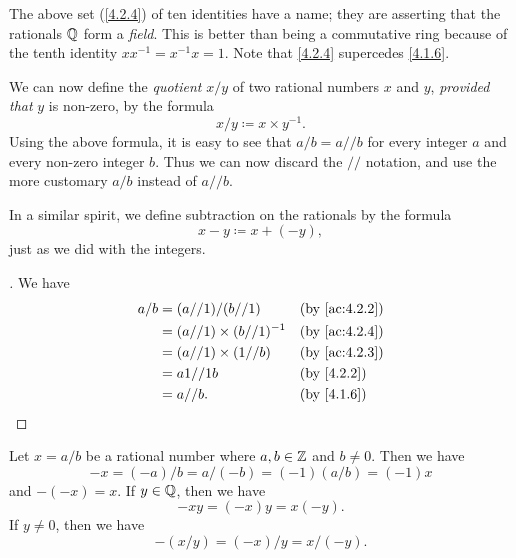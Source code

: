 \begin{rmk}\label{4.2.5}
  The above set (\cref{4.2.4}) of ten identities have a name;
  they are asserting that the rationals \(\mathbb{Q}\) form a \emph{field}.
  This is better than being a commutative ring because of the tenth identity \(xx^{-1} = x^{-1}x = 1\).
  Note that \cref{4.2.4} supercedes \cref{4.1.6}.
\end{rmk}

\begin{ac}\label{ac:4.2.4}
  We can now define the \emph{quotient} \(x / y\) of two rational numbers \(x\) and \(y\), \emph{provided that} \(y\) is non-zero, by the formula
  \[
    x / y \coloneqq x \times y^{-1}.
  \]
  Using the above formula, it is easy to see that \(a / b = a // b\) for every integer \(a\) and every non-zero integer \(b\).
  Thus we can now discard the \(//\) notation, and use the more customary \(a / b\) instead of \(a // b\).

  In a similar spirit, we define subtraction on the rationals by the formula
  \[
    x - y \coloneqq x + (-y),
  \]
  just as we did with the integers.
\end{ac}

\begin{proof}[]
  We have
  \begin{align*}
    a / b & = (a // 1) / (b // 1)           &  & \by{ac:4.2.2} \\
          & = (a // 1) \times (b // 1)^{-1} &  & \by{ac:4.2.4} \\
          & = (a // 1) \times (1 // b)      &  & \by{ac:4.2.3} \\
          & = a1 // 1b                      &  & \by{4.2.2}    \\
          & = a // b.                       &  & \by{4.1.6}
  \end{align*}
\end{proof}

\begin{ac}\label{ac:4.2.5}
  Let \(x = a / b\) be a rational number where \(a, b \in \mathbb{Z}\) and \(b \neq 0\).
  Then we have
  \[
    -x = (-a) / b = a / (-b) = (-1) (a / b) = (-1) x
  \]
  and \(-(-x) = x\).
  If \(y \in \mathbb{Q}\), then we have
  \[
    -xy = (-x) y = x (-y).
  \]
  If \(y \neq 0\), then we have
  \[
    -(x / y) = (-x) / y = x / (-y).
  \]
\end{ac}


